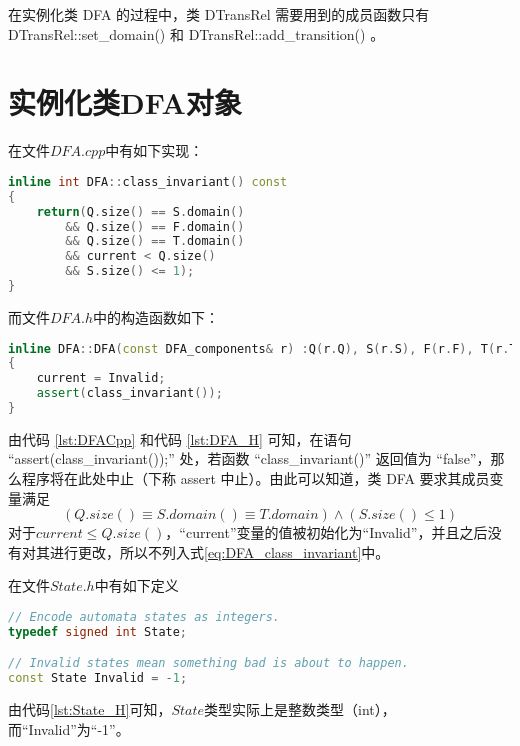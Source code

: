 在实例化类 DFA 的过程中，类 DTransRel 需要用到的成员函数只有 DTransRel::set\_domain() 和 DTransRel::add\_transition() 。







\newpage
\section{实例化类DFA对象}\label{sec:get_a_dfa}

在文件$DFA.cpp$中有如下实现：

\begin{lstlisting}[language=C++,label={lst:DFACpp},caption={DFA.cpp}]
inline int DFA::class_invariant() const
{
	return(Q.size() == S.domain()
		&& Q.size() == F.domain()
		&& Q.size() == T.domain()
		&& current < Q.size()
		&& S.size() <= 1);
}
\end{lstlisting}
而文件$DFA.h$中的构造函数如下：

\begin{lstlisting}[language=C++,label={lst:DFA_H},caption={DFA.h}]
inline DFA::DFA(const DFA_components& r) :Q(r.Q), S(r.S), F(r.F), T(r.T)
{
	current = Invalid;
	assert(class_invariant());
}
\end{lstlisting}
由代码 \ref{lst:DFACpp} 和代码 \ref{lst:DFA_H} 可知，在语句 “assert(class\_invariant());” 处，若函数 “class\_invariant()” 返回值为 “false”，那么程序将在此处中止\cite{assert_abort}（下称 assert 中止）。由此可以知道，类 DFA 要求其成员变量满足
\begin{equation}\label{eq:DFA_class_invariant}
    (Q.size() \equiv S.domain() \equiv T.domain ) \land (S.size() \leq 1)
\end{equation}
对于$current \le Q.size() $，“current”变量的值被初始化为“Invalid”，并且之后没有对其进行更改，所以不列入式\ref{eq:DFA_class_invariant}中。

在文件$State.h$中有如下定义

\begin{lstlisting}[language=C++,label={lst:State_H},caption={State.h}]
// Encode automata states as integers.
typedef signed int State;

// Invalid states mean something bad is about to happen.
const State Invalid = -1;
\end{lstlisting}
由代码\ref{lst:State_H}可知，$State$类型实际上是整数类型（int），而“Invalid”为“-1”。

